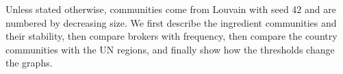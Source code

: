 Unless stated otherwise, communities come from Louvain with seed 42 and are
numbered by decreasing size. We first describe the ingredient communities and
their stability, then compare brokers with frequency, then compare the country
communities with the UN regions, and finally show how the thresholds change
the graphs.
